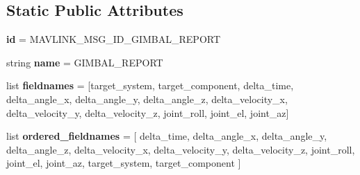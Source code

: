 \subsection*{Static Public Attributes}
\begin{DoxyCompactItemize}
\item 
\mbox{\label{classpymavlink_1_1dialects_1_1v10_1_1MAVLink__gimbal__report__message_a9b541e65d5322578272c39c1ba639981}} 
{\bfseries id} = M\+A\+V\+L\+I\+N\+K\+\_\+\+M\+S\+G\+\_\+\+I\+D\+\_\+\+G\+I\+M\+B\+A\+L\+\_\+\+R\+E\+P\+O\+RT
\item 
\mbox{\label{classpymavlink_1_1dialects_1_1v10_1_1MAVLink__gimbal__report__message_a4e1ab5f0f0fa6b2cdc007c353e07035d}} 
string {\bfseries name} = \textquotesingle{}G\+I\+M\+B\+A\+L\+\_\+\+R\+E\+P\+O\+RT\textquotesingle{}
\item 
\mbox{\label{classpymavlink_1_1dialects_1_1v10_1_1MAVLink__gimbal__report__message_a774bd5757d45a93285f1a05ba58c0272}} 
list {\bfseries fieldnames} = \mbox{[}\textquotesingle{}target\+\_\+system\textquotesingle{}, \textquotesingle{}target\+\_\+component\textquotesingle{}, \textquotesingle{}delta\+\_\+time\textquotesingle{}, \textquotesingle{}delta\+\_\+angle\+\_\+x\textquotesingle{}, \textquotesingle{}delta\+\_\+angle\+\_\+y\textquotesingle{}, \textquotesingle{}delta\+\_\+angle\+\_\+z\textquotesingle{}, \textquotesingle{}delta\+\_\+velocity\+\_\+x\textquotesingle{}, \textquotesingle{}delta\+\_\+velocity\+\_\+y\textquotesingle{}, \textquotesingle{}delta\+\_\+velocity\+\_\+z\textquotesingle{}, \textquotesingle{}joint\+\_\+roll\textquotesingle{}, \textquotesingle{}joint\+\_\+el\textquotesingle{}, \textquotesingle{}joint\+\_\+az\textquotesingle{}\mbox{]}
\item 
\mbox{\label{classpymavlink_1_1dialects_1_1v10_1_1MAVLink__gimbal__report__message_a45891e1a9200150bed71db54cd19bbf1}} 
list {\bfseries ordered\+\_\+fieldnames} = \mbox{[} \textquotesingle{}delta\+\_\+time\textquotesingle{}, \textquotesingle{}delta\+\_\+angle\+\_\+x\textquotesingle{}, \textquotesingle{}delta\+\_\+angle\+\_\+y\textquotesingle{}, \textquotesingle{}delta\+\_\+angle\+\_\+z\textquotesingle{}, \textquotesingle{}delta\+\_\+velocity\+\_\+x\textquotesingle{}, \textquotesingle{}delta\+\_\+velocity\+\_\+y\textquotesingle{}, \textquotesingle{}delta\+\_\+velocity\+\_\+z\textquotesingle{}, \textquotesingle{}joint\+\_\+roll\textquotesingle{}, \textquotesingle{}joint\+\_\+el\textquotesingle{}, \textquotesingle{}joint\+\_\+az\textquotesingle{}, \textquotesingle{}target\+\_\+system\textquotesingle{}, \textquotesingle{}target\+\_\+component\textquotesingle{} \mbox{]}

\end{DoxyCompactItemize}
